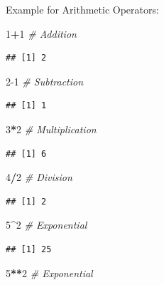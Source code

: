 \documentclass[
]{article}
\newenvironment{Shaded}{\begin{snugshade}}{\end{snugshade}}
\newcommand{\CommentTok}[1]{\textcolor[rgb]{0.56,0.35,0.01}{\textit{#1}}}
\newcommand{\DecValTok}[1]{\textcolor[rgb]{0.00,0.00,0.81}{#1}}
\newcommand{\SpecialCharTok}[1]{\textcolor[rgb]{0.81,0.36,0.00}{\textbf{#1}}}
\begin{document}
Example for Arithmetic Operators:

\begin{Shaded}
\begin{Highlighting}[]
\DecValTok{1}\SpecialCharTok{+}\DecValTok{1} \CommentTok{\# Addition}
\end{Highlighting}
\end{Shaded}

\begin{verbatim}
## [1] 2
\end{verbatim}

\begin{Shaded}
\begin{Highlighting}[]
\DecValTok{2{-}1} \CommentTok{\# Subtraction}
\end{Highlighting}
\end{Shaded}

\begin{verbatim}
## [1] 1
\end{verbatim}

\begin{Shaded}
\begin{Highlighting}[]
\DecValTok{3}\SpecialCharTok{*}\DecValTok{2} \CommentTok{\# Multiplication}
\end{Highlighting}
\end{Shaded}

\begin{verbatim}
## [1] 6
\end{verbatim}

\begin{Shaded}
\begin{Highlighting}[]
\DecValTok{4}\SpecialCharTok{/}\DecValTok{2} \CommentTok{\# Division}
\end{Highlighting}
\end{Shaded}

\begin{verbatim}
## [1] 2
\end{verbatim}

\begin{Shaded}
\begin{Highlighting}[]
\DecValTok{5}\SpecialCharTok{\^{}}\DecValTok{2} \CommentTok{\# Exponential}
\end{Highlighting}
\end{Shaded}

\begin{verbatim}
## [1] 25
\end{verbatim}

\begin{Shaded}
\begin{Highlighting}[]
\DecValTok{5}\SpecialCharTok{**}\DecValTok{2} \CommentTok{\# Exponential}
\end{Highlighting}
\end{Shaded}
\end{document}
